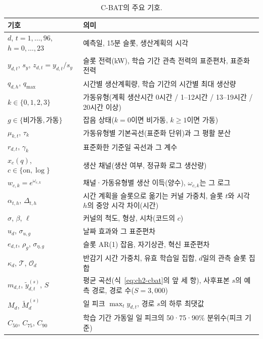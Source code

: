 \begin{table}[htbp]
\centering
\hwptablefont
\caption{C-BAT의 주요 기호.}\label{tab:ch2-notation}
\begin{tabular}{L{4.4cm}L{11.2cm}}
\toprule
기호 & 의미 \\
\midrule
$d$, $t=1,\dots,96$, $h=0,\dots,23$ & 예측일, 15분 슬롯, 생산계획의 시각 \\
$y_{d,t}$, $s_y$, $z_{d,t}=y_{d,t}/s_y$ & 슬롯 전력(kW), 학습 기간 관측 전력의 표준편차, 표준화 전력 \\
$q_{d,h}$, $q_{\max}$ & 시간별 생산계획량, 학습 기간의 시간별 최대 생산량 \\
$k\in\{0,1,2,3\}$ & 가동유형(계획 생산시간 0시간 / 1--12시간 / 13--19시간 / 20시간 이상) \\
$g\in\{\text{비가동},\text{가동}\}$ & 잡음 상태($k=0$이면 비가동, $k\ge1$이면 가동) \\
$\mu_{k,t}$, $\tau_k$ & 가동유형별 기본곡선(표준화 단위)과 그 평활 분산 \\
$r_{d,t}$, $\gamma_k$ & 표준화한 기준일 곡선과 그 계수 \\
$x_c(q)$, $c\in\{\mathrm{on},\log\}$ & 생산 채널(생산 여부, 정규화 로그 생산량) \\
$w_{c,k}=e^{\omega_{c,k}}$ & 채널·가동유형별 생산 이득(양수), $\omega_{c,k}$는 그 로그 \\
$\alpha_{t,h}$, $\Delta_{t,h}$ & 시간 계획을 슬롯으로 옮기는 커널 가중치, 슬롯 $t$와 시각 $h$의 중앙 시각 차이(시간) \\
$\sigma$, $\beta$, $\ell$ & 커널의 척도, 형상, 시차(코드의 $c$) \\
$u_d$, $\sigma_{u,g}$ & 날짜 효과와 그 표준편차 \\
$e_{d,t}$, $\rho_g$, $\sigma_{\eta,g}$ & 슬롯 AR(1) 잡음, 자기상관, 혁신 표준편차 \\
$\kappa_d$, $\mathcal T$, $\mathcal O_d$ & 반감기 시간 가중치, 유효 학습일 집합, $d$일의 관측 슬롯 집합 \\
$m_{d,t}$, $\tilde y^{(s)}_{d,t}$, $S$ & 평균 곡선(식~\ref{eq:ch2-cbat}의 앞 세 항), 사후표본 $s$의 예측 경로, 경로 수($S=3{,}000$) \\
$M_d$, $\tilde M^{(s)}_d$ & 일 피크 $\max_t y_{d,t}$, 경로 $s$의 하루 최댓값 \\
$C_{50}$, $C_{75}$, $C_{90}$ & 학습 기간 가동일 일 피크의 50·75·90\% 분위수(피크 기준) \\
\bottomrule
\end{tabular}
\end{table}

